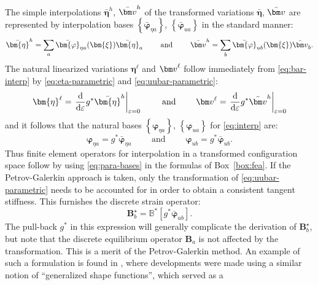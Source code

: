The simple interpolations
\(\bar{\bm{\eta}}^h\), \(\bar{\VarConfig}^h\) of the transformed variations
\(\bar{\bm{\eta}}\), \(\bar{\VarConfig}\) are represented by interpolation
bases \(\left\{\bar{\bm{\varphi}}^{}_{\eta a}\right\}\),
\(\left\{\bar{\bm{\varphi}}^{}_{u a}\right\}\) in the standard manner:
%
\begin{equation}
  \bar{\bm{\eta}}^h = \sum_a \bar{\bm{\varphi}}^{}_{\eta a}(\bm{\xi})\bar{\bm{\eta}}^{}_a
  \qquad\text{ and }\qquad
  \bar{\VarConfig}^h = \sum_b \bar{\bm{\varphi}}^{}_{u b}(\bm{\xi}) \bar{\VarConfig}^{}_b.
  \label{eq:bar-interp}
\end{equation}
%
The natural linearized variations
\(\bm{\eta}^\ell\) and \(\VarConfig^\ell\) follow immediately from
\eqref{eq:bar-interp} by \eqref{eq:eta-parametric} and
\eqref{eq:uubar-parametric}:
%
\begin{equation*} 
\bm{\eta}^\ell = \left. \frac{\mathrm{d}}{\mathrm{d}\varepsilon} g^*\bar{\bm{\eta}}^h \right|_{\varepsilon=0}
\qquad\text{ and }\qquad
\VarConfig^\ell = \left. \frac{\mathrm{d}}{\mathrm{d}\varepsilon} g^*\bar{\VarConfig}^h  \right|_{\varepsilon=0}
\end{equation*}
%
and it follows that the natural bases
\(\left\{{\bm{\varphi}}^{}_{\eta a}\right\}\),
\(\left\{{\bm{\varphi}}^{}_{u a}\right\}\) for \eqref{eq:interp} are:
%
\begin{equation}
\bm{\varphi}_{\eta a} = g^* \bar{\bm{\varphi}}_{\eta a}
\qquad\text{ and }\qquad
\bm{\varphi}_{u b} = g^* \bar{\bm{\varphi}}_{u b}.
\label{eq:para-bases}
\end{equation} 
%
Thus finite element operators for
interpolation in a transformed configuration space follow by using
\eqref{eq:para-bases} in the formulas of Box~\ref{box:fea}. 
If the Petrov-Galerkin
approach is taken, only the transformation of \eqref{eq:uubar-parametric}
needs to be accounted for in order to obtain a consistent tangent
stiffness. This furnishes the discrete strain operator:
\begin{equation*} 
  \bm{B}^\star_b = \mathbb{B}^* \left[g^*\bar{\bm{\varphi}}_{u b}\right].
\end{equation*}
The pull-back \(g^*\) in this expression will generally complicate
the derivation of \(\bm{B}^\star_b\), but note that the discrete equilibrium operator
\(\bm{B}_a\) is not affected by the transformation. This is a merit of the Petrov-Galerkin
method.
An example of such a formulation is found in
\cite{jelenić1998interpolation}, where developments were made using a
similar notion of ``generalized shape functions'', which served as a
